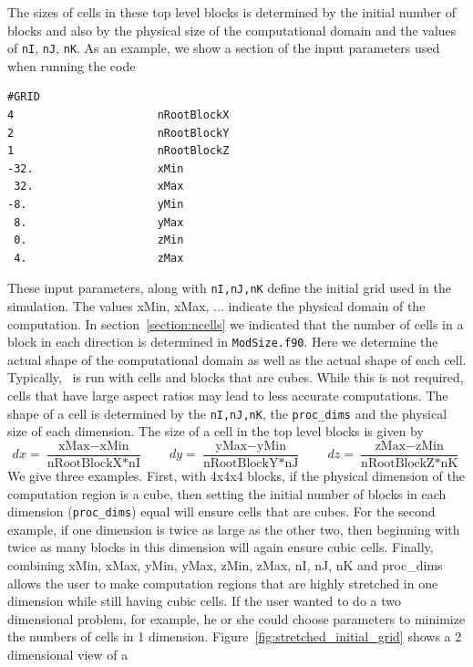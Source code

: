 The sizes of cells in these top level blocks is determined by the
initial number of blocks and also by the physical size of the
computational domain and the values of {\tt nI}, {\tt nJ}, {\tt nK}.
As an example, we show a section of the input parameters used when
running the code
\begin{verbatim}
#GRID        
4                      nRootBlockX
2                      nRootBlockY
1                      nRootBlockZ
-32.                   xMin
 32.                   xMax
-8.                    yMin
 8.                    yMax
 0.                    zMin
 4.                    zMax
\end{verbatim}
These input parameters, along with  
{\tt nI,nJ,nK} define the initial grid used in the simulation.
The values xMin, xMax, ... indicate the physical 
domain of the computation.  In section~\ref{section:ncells}
we indicated that the number of cells in a block in each direction is determined
in {\tt ModSize.f90}.  Here we determine the actual shape of the computational
domain as well as the actual shape of each cell. Typically, \BATSRUS\ is
run with cells and blocks that are cubes.  While this is not required, 
cells that have large aspect ratios may lead to less accurate computations.  
The shape of a cell is
determined by the {\tt nI,nJ,nK}, the {\tt proc\_dims} and the physical size of 
each dimension. The size of a cell in the top level blocks is given by 
\begin{equation}
  dx = \frac{ \mbox{xMax}-\mbox{xMin} }{\mbox{nRootBlockX}*\mbox{nI}} \qquad
  dy = \frac{ \mbox{yMax}-\mbox{yMin} }{\mbox{nRootBlockY}*\mbox{nJ}} \qquad
  dz = \frac{ \mbox{zMax}-\mbox{zMin} }{\mbox{nRootBlockZ}*\mbox{nK}}
\end{equation}
We give three examples.
First, with 4x4x4 blocks, if the physical dimension
of the computation region is a cube, then setting the initial number of blocks
in each dimension ({\tt proc\_dims}) equal will ensure cells that are cubes.  
For the second example, if one dimension is twice
as large as the other two, then beginning with twice as many blocks in this dimension
will again ensure cubic cells.  
Finally, combining xMin, xMax, yMin, yMax, zMin, zMax, nI, nJ, nK and proc\_dims 
allows the user to make computation
regions that are highly stretched in one dimension while still having
cubic cells.  If the user wanted to do a two dimensional problem, for example,
he or she could choose parameters to minimize the numbers of cells in 1 dimension.
Figure~\ref{fig:stretched_initial_grid} shows a 2 dimensional view of a 
